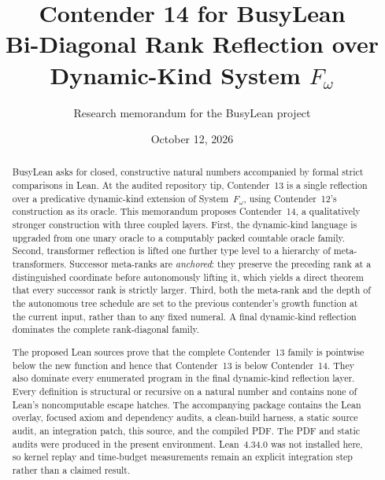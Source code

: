 \documentclass[11pt]{article}
\title{\textbf{Contender 14 for BusyLean}\\[0.35em]
  \Large Bi-Diagonal Rank Reflection over Dynamic-Kind System $F_\omega$}
\author{Research memorandum for the BusyLean project}
\date{October 12, 2026}
\theoremstyle{definition}
\theoremstyle{remark}
\begin{document}
\maketitle

\begin{abstract}
BusyLean asks for closed, constructive natural numbers accompanied by formal
strict comparisons in Lean.  At the audited repository tip, Contender~13 is a
single reflection over a predicative dynamic-kind extension of
System~$F_\omega$, using Contender~12's construction as its oracle.  This
memorandum proposes Contender~14, a qualitatively stronger construction with
three coupled layers.  First, the dynamic-kind language is upgraded from one
unary oracle to a computably packed countable oracle family.  Second,
transformer reflection is lifted one further type level to a hierarchy of
meta-transformers.  Successor meta-ranks are \emph{anchored}: they preserve the
preceding rank at a distinguished coordinate before autonomously lifting it,
which yields a direct theorem that every successor rank is strictly larger.
Third, both the meta-rank and the depth of the autonomous tree schedule are set
to the previous contender's growth function at the current input, rather than
to any fixed numeral.  A final dynamic-kind reflection dominates the complete
rank-diagonal family.

The proposed Lean sources prove that the complete Contender~13 family is
pointwise below the new function and hence that Contender~13 is below
Contender~14.  They also dominate every enumerated program in the final
dynamic-kind reflection layer.  Every definition is
structural or recursive on a natural number and contains none of Lean's
noncomputable escape hatches.  The accompanying package contains the Lean
overlay, focused axiom and dependency audits, a clean-build harness, a static
source audit, an integration patch, this source, and the compiled PDF.  The
PDF and static audits were produced in the present environment.  Lean~4.34.0
was not installed here, so kernel replay and time-budget measurements remain an
explicit integration step rather than a claimed result.
\end{abstract}
\end{document}
